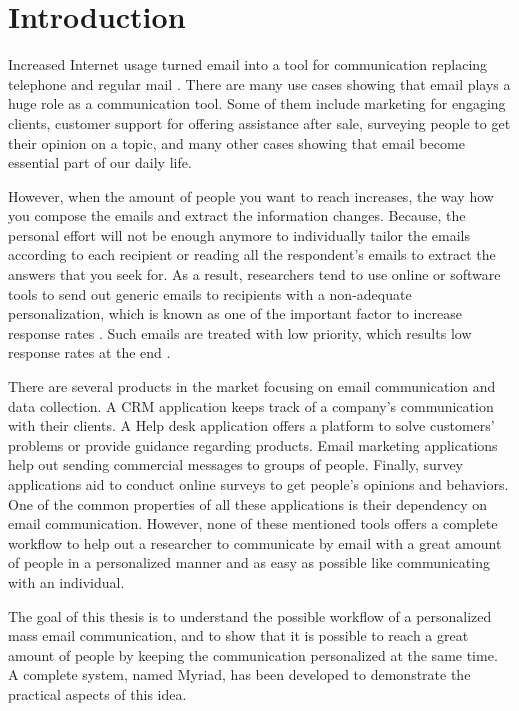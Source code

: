 \chapter{Introduction}
\label{chp:Intro}
Increased Internet usage turned email into a tool for communication replacing telephone and regular mail \citep{Norman2000,Madden2003}. There are many use cases showing that email plays a huge role as a communication tool. Some of them include marketing for engaging clients, customer support for offering assistance after sale, surveying people to get their opinion on a topic, and many other cases showing that email become essential part of our daily life.
\vspace{1cm}

However, when the amount of people you want to reach increases, the way how you compose the emails and extract the information changes. Because, the personal effort will not be enough anymore to individually tailor the emails according to each recipient or reading all the respondent's emails to extract the answers that you seek for. As a result, researchers tend to use online or software tools to send out generic emails to recipients with a non-adequate personalization, which is known as one of the important factor to increase response rates \citep{Dillman1991,Schaefer1998}. Such emails are treated with low priority, which results low response rates at the end \citep[page 272]{DillmanDonA.SmythJoleneD.Christian2009}.
\vspace{1cm}

There are several products in the market focusing on email communication and data collection. A \ac{CRM} application keeps track of a company's communication with their clients. A Help desk application offers a platform to solve customers' problems or provide guidance regarding products. Email marketing applications help out sending commercial messages to groups of people. Finally, survey applications aid to conduct online surveys to get people's opinions and behaviors. One of the common properties of all these applications is their dependency on email communication. However, none of these mentioned tools offers a complete workflow to help out a researcher to communicate by email with a great amount of people in a personalized manner and as easy as possible like communicating with an individual.
\vspace{1cm}

The goal of this thesis is to understand the possible workflow of a personalized mass email communication, and to show that it is possible to reach a great amount of people by keeping the communication personalized at the same time. A complete system, named Myriad, has been developed to demonstrate the practical aspects of this idea.

